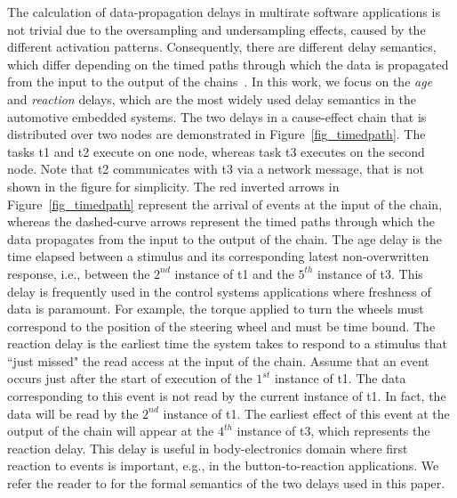 The calculation of data-propagation delays in multirate software applications is not trivial due to the oversampling and undersampling effects, caused by the different activation patterns. Consequently, there are different delay semantics, which differ depending on the timed paths through which the data is propagated from the input to the output of the chains~\cite{mubeen2013support}. In this work, we focus on the \textit{age} and \textit{reaction} delays, which are the most widely used delay semantics in the automotive embedded systems. The two delays in a cause-effect chain that is distributed over two nodes  are demonstrated in Figure~\ref{fig_timedpath}. The tasks t1 and t2 execute on one node, whereas task t3 executes on the second node. Note that t2 communicates with t3 via a network message, that is not shown in the figure for simplicity. The red inverted arrows in Figure~\ref{fig_timedpath} represent the arrival of events at the input of the chain, whereas the dashed-curve arrows represent the timed paths through which the data propagates from the input to the output of the chain. The age delay is the time elapsed between a stimulus and its corresponding latest non-overwritten response, i.e., between the $2^{nd}$ instance of t1 and the $5^{th}$ instance of t3. This delay is frequently used in the control systems applications where freshness of data is paramount. For example, the torque applied to turn the wheels must correspond to the position of the steering wheel and must be time bound. The reaction delay is the earliest time the system takes to respond to a stimulus that ``just missed" the read access at the input of the chain. Assume that an event occurs just after the start of execution of the $1^{st}$ instance of t1. The data corresponding to this event is not read by the current instance of t1. In fact, the data will be read by the $2^{nd}$ instance of t1. The earliest effect of this event at the output of the chain will appear at the $4^{th}$ instance of t3, which represents the reaction delay. This delay is useful in body-electronics domain where first reaction to events is important, e.g., in the button-to-reaction applications. We refer the reader to \cite{mubeen2013support} for the formal semantics of the two delays used in this paper.

